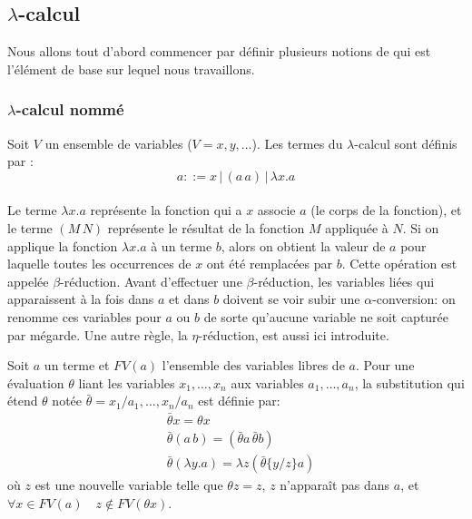\subsection{$\lambda$-calcul}

Nous allons tout d'abord commencer par définir plusieurs notions de \lc{} qui est l'élément de base sur lequel nous travaillons. 

\subsubsection{$\lambda$-calcul nommé}

Soit $V$ un ensemble de variables ($V={x,y,\dots}$). Les termes du $\lambda$-calcul sont définis par :
\[ a ::= x \,|\, (a \, a) \,| \,\lambda x. a\]

\paragraph{}
Le terme $\lambda x.a$ représente la fonction qui a $x$ associe $a$ (le corps de la fonction), et le terme $(M \, N)$ représente le résultat de la fonction $M$ appliquée à $N$. Si on applique la fonction $\lambda x.a$ à un terme $b$, alors on obtient la valeur de $a$ pour laquelle toutes les occurrences de $x$ ont été remplacées par $b$. Cette opération est appelée $\beta$-réduction. Avant d’effectuer une $\beta$-réduction, les variables liées qui apparaissent à la fois dans $a$ et dans $b$ doivent se voir subir une $\alpha$-conversion: on renomme ces variables pour $a$ ou $b$ de sorte qu'aucune variable ne soit capturée par mégarde. Une autre règle, la $\eta$-réduction, est aussi ici introduite.

\begin{defn}
Soit $a$ un terme et $FV(a)$ l’ensemble des variables libres de $a$. Pour une évaluation $\theta$ liant les variables $x_1,\dots,x_n$ aux variables $a_1,\dots,a_n$, la substitution qui étend $\theta$ notée $\bar{\theta}={x_1/a_1,\dots,x_n/a_n}$ est définie par:
\begin{align*}
&\bar{\theta}x = \theta x \\
&\bar{\theta}(a \, b) = (\bar{\theta}a \, \bar{\theta}b) \\
& \bar{\theta}(\lambda y.a) = \lambda z (\bar{\theta}\{y/z\}a) 
\end{align*}
où $z$ est une nouvelle variable telle que $\theta z = z$, $z$ n'apparaît pas dans $a$, et $\forall{x} \in FV(a) \quad z \notin FV(\theta x)$.
\end{defn}

